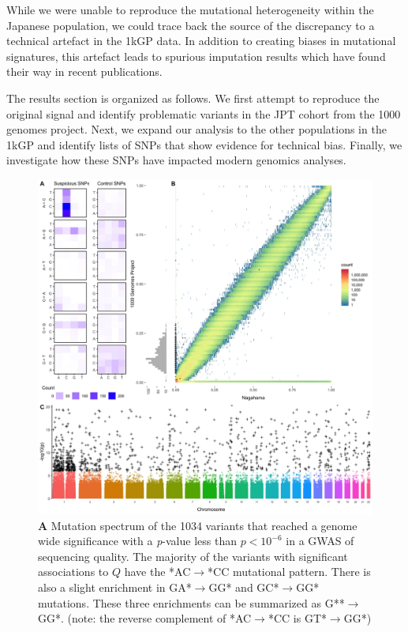 \documentclass[9pt,lineno]{elife}
\begin{document}
While we were unable to reproduce the mutational heterogeneity within the Japanese population, we could trace back the source of the discrepancy to a technical artefact in the 1kGP data.
In addition to creating biases in mutational signatures, this artefact leads to spurious imputation results which have found their way in recent publications.


The results section is organized as follows.
We first attempt to reproduce the original signal and identify problematic variants in the JPT cohort from the 1000 genomes project. 
Next, we expand our analysis to the other populations in the 1kGP and identify lists of SNPs that show evidence for technical bias.
Finally, we investigate how these SNPs have impacted modern genomics analyses.  
  

\begin{figure}
\includegraphics[width=\hsize,keepaspectratio]{./Figures/Figure1.jpg}
\caption{
\textbf{A} 
Mutation spectrum of the 1034 variants that reached a genome wide significance with a \textit{p}-value less than $p < 10^{-6}$  in a GWAS of sequencing quality. 
The majority of the variants with significant associations to $Q$ have the *AC${\rightarrow}$*CC mutational pattern. There is also a slight enrichment in GA*${\rightarrow}$GG* and GC*${\rightarrow}$GG* mutations. These three enrichments can be summarized as G**${\rightarrow}$GG*. (note: the reverse complement of *AC${\rightarrow}$*CC is GT*${\rightarrow}$GG*)
}
\end{figure}
\end{document}
